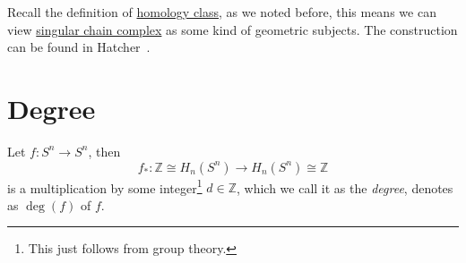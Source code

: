 \begin{remark}
	Recall the definition of \hyperref[def:homology-class]{homology class}, as we noted before, this means we can view \hyperref[def:singular-chain-complex]{singular chain complex} as some kind of geometric subjects. The construction can be found in Hatcher~\cite{hatcher2002algebraic}.
\end{remark}

\section{Degree}
\begin{definition}[Degree]\label{def:degree}
	Let \(f \colon S^n \to S^n\), then
	\[
		f_\ast \colon \mathbb{Z} \cong H_n(S^n) \to H_n(S^n) \cong \mathbb{Z}
	\]
	is a multiplication by some integer\footnote{This just follows from group theory.} \(d \in \mathbb{Z}\), which we call it as the \emph{degree}, denotes as \(\deg(f)\) of \(f\).
\end{definition}

